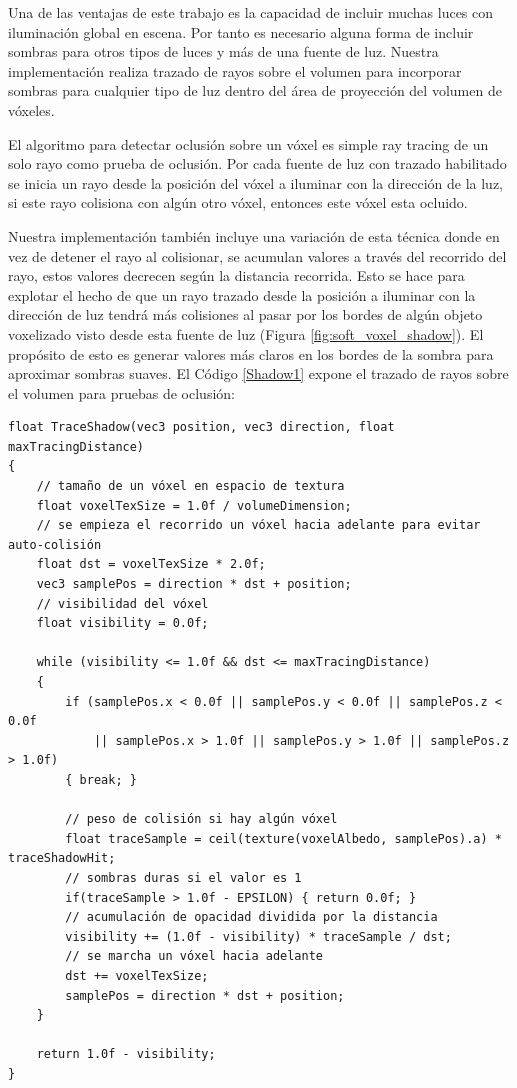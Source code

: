 Una de las ventajas de este trabajo es la capacidad de incluir muchas luces con iluminación global en escena. Por tanto es necesario alguna forma de incluir sombras para otros tipos de luces y más de una fuente de luz. Nuestra implementación realiza trazado de rayos sobre el volumen para incorporar sombras para cualquier tipo de luz dentro del área de proyección del volumen de vóxeles.

El algoritmo para detectar oclusión sobre un vóxel es simple ray tracing de un solo rayo como prueba de oclusión. Por cada fuente de luz con trazado habilitado se inicia un rayo desde la posición del vóxel a iluminar con la dirección de la luz, si este rayo colisiona con algún otro vóxel, entonces este vóxel esta ocluido.

Nuestra implementación también incluye una variación de esta técnica donde en vez de detener el rayo al colisionar, se acumulan valores a través del recorrido del rayo, estos valores decrecen según la distancia recorrida. Esto se hace para explotar el hecho de que un rayo trazado desde la posición a iluminar con la dirección de luz tendrá más colisiones al pasar por los bordes de algún objeto voxelizado visto desde esta fuente de luz (Figura \ref{fig:soft_voxel_shadow}). El propósito de esto es generar valores más claros en los bordes de la sombra para aproximar sombras suaves. El Código \ref{Shadow1} expone el trazado de rayos sobre el volumen para pruebas de oclusión:
\\
\begin{lstlisting}[caption={Trazado de rayos sobre volumen albedo para sombras sobre vóxeles}, label=Shadow1]
float TraceShadow(vec3 position, vec3 direction, float maxTracingDistance) 
{
    // tamaño de un vóxel en espacio de textura
    float voxelTexSize = 1.0f / volumeDimension;
    // se empieza el recorrido un vóxel hacia adelante para evitar auto-colisión
    float dst = voxelTexSize * 2.0f;
    vec3 samplePos = direction * dst + position;
    // visibilidad del vóxel
    float visibility = 0.0f;

    while (visibility <= 1.0f && dst <= maxTracingDistance) 
    {
        if (samplePos.x < 0.0f || samplePos.y < 0.0f || samplePos.z < 0.0f
            || samplePos.x > 1.0f || samplePos.y > 1.0f || samplePos.z > 1.0f) 
        { break; }
        
        // peso de colisión si hay algún vóxel
        float traceSample = ceil(texture(voxelAlbedo, samplePos).a) * traceShadowHit;
        // sombras duras si el valor es 1
        if(traceSample > 1.0f - EPSILON) { return 0.0f; }
        // acumulación de opacidad dividida por la distancia
        visibility += (1.0f - visibility) * traceSample / dst;
        // se marcha un vóxel hacia adelante
        dst += voxelTexSize;
        samplePos = direction * dst + position;
    }

    return 1.0f - visibility;
}
\end{lstlisting}

